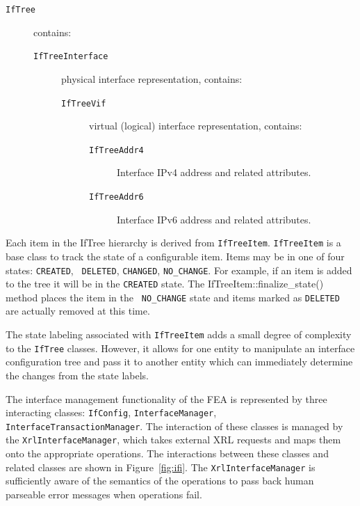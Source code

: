 \documentclass[11pt]{article}
\begin{document}
\begin{description}
\item [\tt IfTree] contains:
  \begin{description}
  \item [\tt IfTreeInterface] physical interface representation, contains:
    \begin{description}
    \item [\tt IfTreeVif] virtual (logical) interface representation, contains:
      \begin{description}
      \item [\tt IfTreeAddr4] Interface IPv4 address and related attributes.
      \item [\tt IfTreeAddr6] Interface IPv6 address and related attributes.
      \end{description}
    \end{description}
  \end{description}
\end{description}

Each item in the IfTree hierarchy is derived from {\tt IfTreeItem}.
{\tt IfTreeItem} is a base class to track the state of a configurable
item. Items may be in one of four states: {\tt CREATED}, {\tt
DELETED}, {\tt CHANGED}, {\tt NO\_CHANGE}.  For example, if an
item is added to the tree it will be in the {\tt CREATED} state.  The
{IfTreeItem::finalize\_state()} method places the item in the {\tt
NO\_CHANGE} state and items marked as {\tt DELETED} are actually
removed at this time.  

The state labeling associated with {\tt IfTreeItem} adds a small
degree of complexity to the {\tt IfTree} classes. However, it allows
for one entity to manipulate an interface configuration tree and pass
it to another entity which can immediately determine the changes from
the state labels.

The interface management functionality of the FEA is represented by
three interacting classes: {\tt IfConfig}, {\tt InterfaceManager},
{\tt InterfaceTransactionManager}.  The interaction of these classes
is managed by the {\tt XrlInterfaceManager}, which takes external XRL
requests and maps them onto the appropriate operations.  The
interactions between these classes and related classes are shown in
Figure~\ref{fig:ifi}. The {\tt XrlInterfaceManager} is sufficiently
aware of the semantics of the operations to pass back human parseable
error messages when operations fail.
\end{document}
